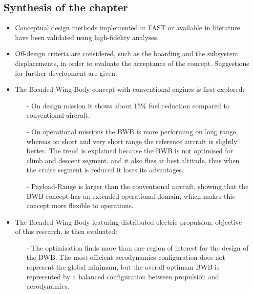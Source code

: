 \begin{mdframed}[hidealllines=true,backgroundcolor=blue!20]
	\section*{Synthesis of the chapter}
	
	\begin{itemize}
		
		\item Conceptual design methods implemented in FAST or available in literature have been validated using high-fidelity analyses. 
		
		\item Off-design criteria are considered, such as the boarding and the subsystem displacements, in order to evaluate the acceptance of the concept. Suggestions for further development are given. 
		
		\item The Blended Wing-Body concept with conventional engines is first explored: 
		\begin{itemize}
			\item[-] On design mission it shows about 15\% fuel reduction compared to conventional aircraft. 
			
			\item[-] On operational missions the BWB is more performing on long range, whereas on short and very short range the reference aircraft is slightly better. The trend is explained because the BWB is not optimised for climb and descent segment, and it also flies at best altitude, thus when the cruise segment is reduced it loses its advantages. 
			
			\item[-] Payload-Range is larger than the conventional aircraft, showing that the BWB concept has an extended operational domain, which makes this concept more flexible to operations.
		\end{itemize}
	
		\item The Blended Wing-Body featuring distributed electric propulsion, objective of this research, is then evaluated: 
		\begin{itemize}
			\item[-] The optimisation finds more than one region of interest for the design of the BWB. The most efficient aerodynamics configuration does not represent the global minimum, but the overall optimum BWB is represented by a balanced configuration between propulsion and aerodynamics.
			

\end{itemize}
\end{itemize}
\end{mdframed}
